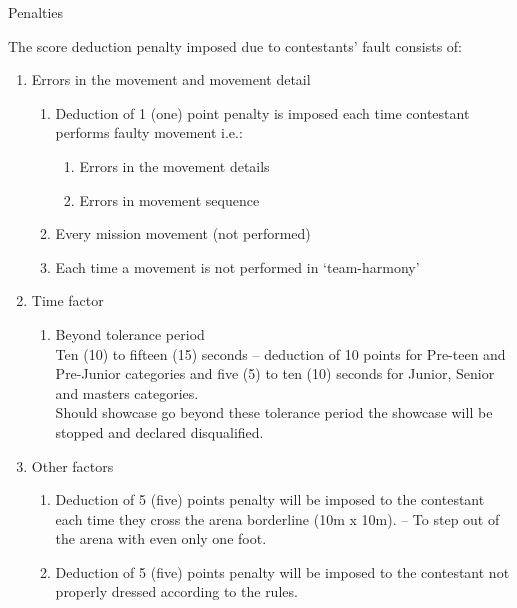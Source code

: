 \begin{legal}
\begin{legal}
    \item Penalties
        \begin{legal}
        \item \label{pt:regu_deductions} The score deduction penalty imposed due to contestants’ fault consists of:
            \begin{enumerate}[label=\alph*.]
            \item Errors in the movement and movement detail
                \begin{enumerate}[label*=\arabic*.]
                \item Deduction of 1 (one) point penalty is imposed each time contestant performs faulty movement i.e.:
                    \begin{enumerate}[label=\roman*.]
                    \item Errors in the movement details
                    \item Errors in movement sequence
                    \end{enumerate}
                \item Every mission movement (not performed)
                \item Each time a movement is not performed in `team-harmony'
                \end{enumerate}

            \item Time factor
                \begin{enumerate}[label*=\arabic*.]
                \item \label{pt:regu_time_factor} Beyond tolerance period \\
                    Ten (10) to fifteen (15) seconds – deduction of 10 points for Pre-teen and Pre-Junior 
                    categories and five (5) to ten (10) seconds for Junior, Senior and masters categories.\\

                    Should showcase go beyond these tolerance period the showcase will be stopped and 
                    declared disqualified.
                \end{enumerate}


            \item Other factors
                \begin{enumerate}[label*=\arabic*.]
                \item Deduction of 5 (five) points penalty will be imposed to the contestant each time they cross 
                    the arena borderline (10m x 10m). – To step out of the arena with even only one foot.
                \item Deduction of 5 (five) points penalty will be imposed to the contestant not properly dressed 
                    according to the rules.
                \end{enumerate}
            \end{enumerate}


\end{legal}
\end{legal}
\end{legal}
